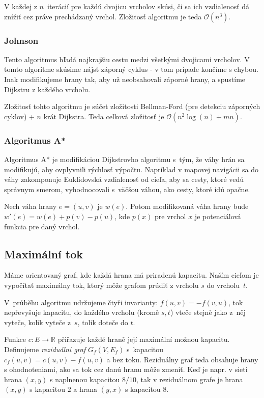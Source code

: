 V každej z $n$~iterácií pre každú dvojicu vrcholov skúsi,
či sa ich vzdialenosť dá znížiť cez práve prechádzaný vrchol. 
Zložitosť algoritmu je teda $\mathcal{O}(n^3)$.

\subsubsection{Johnson}
Tento algoritmus hľadá najkrajšiu cestu medzi všetkými dvojicami vrcholov.
V tomto algoritme skúsime nájsť záporný cyklus - v tom prípade
končíme s chybou. Inak modifikujeme hrany tak, aby už neobsahovali
záporné hrany, a spustíme Dijkstru z každého vrcholu.

Zložitosť tohto algoritmu je súčet zložitosti Bellman-Ford (pre detekciu
záporných cyklov) + $n$ krát Dijkstra. Teda celková zložitosť
je $\mathcal{O}(n^2 \log(n) + mn)$.

\subsubsection{Algoritmus A*}
Algoritmus A* je modifikáciou Dijkstrovho algoritmu s~tým,
že váhy hrán sa modifikujú, aby ovplyvnili rýchlosť výpočtu.
Napríklad v mapovej navigácii sa do váhy zakomponuje Euklidovská
vzdialenosť od cieľa, aby sa cesty, ktoré vedú správnym smerom,
vyhodnocovali s~väčšou váhou, ako cesty, ktoré idú opačne.

Nech váha hrany $e=(u,v)$ je $w(e)$. Potom modifikovaná
váha hrany bude $w'(e) = w(e) + p(v) - p(u)$, kde $p(x)$
pre vrchol $x$ je potenciálová funkcia pre daný vrchol.

\subsection{Maximální tok}
Máme orientovaný graf, kde každá hrana má priradenú kapacitu.
Naším cieľom je vypočítať maximálny tok, ktorý môže
grafom prúdiť z vrcholu $s$ do vrcholu~$t$.

V~průběhu algoritmu udržujeme čtyři invarianty:
$f(u,v) = -f(v,u)$, tok nepřevyšuje kapacitu,
do každého vrcholu (kromě $s,t$) vteče stejně jako z~něj vyteče,
kolik vyteče z~$s$, tolik doteče do $t$.

Funkce $c : E \to \mathbb{R}$ přiřazuje každé hraně její maximální
možnou kapacitu. Definujeme {\em reziduální graf}
$G_{f}(V,E_{f})$ s~kapacitou $c_{f}(u,v)=c(u,v)-f(u,v)$ a bez toku.
Reziduálny graf teda obsahuje hrany s ohodnoteniami, ako sa tok
cez danú hranu môže zmeniť. Keď je napr. v sieti hrana $(x,y)$
s naplnenou kapacitou $8/10$, tak v reziduálnom grafe je
hrana $(x,y)$ s kapacitou $2$ a hrana $(y,x)$ s kapacitou $8$.

